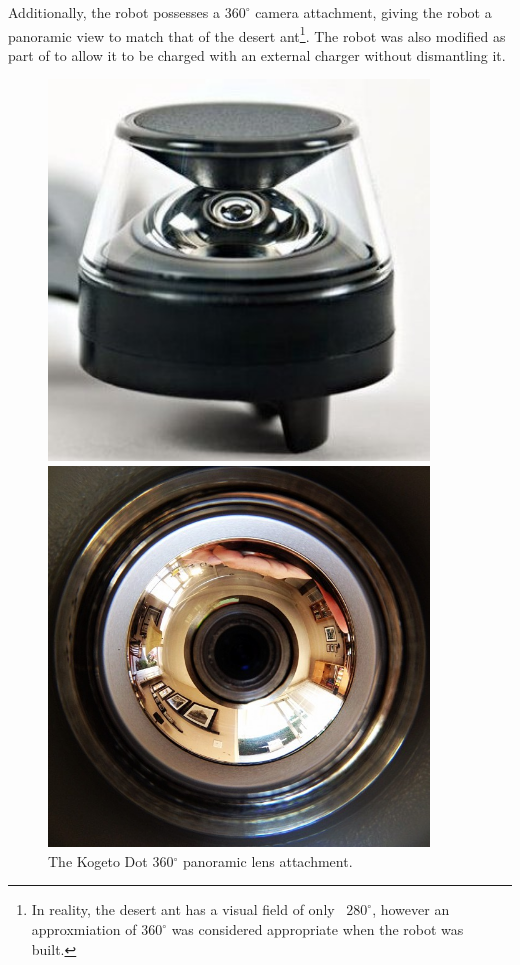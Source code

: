 \documentclass[a4paper,11pt,twoside,openright]{article}
\begin{document}
Additionally, the robot possesses a $360^{\circ}$ camera attachment, giving the
robot a panoramic view to match that of the desert ant\footnote{In reality,
  the desert ant has a visual field of only ~$280^{\circ}$\cite{Ardin2016},
  however an approxmiation of $360^{\circ}$ was considered appropriate when
  the robot was built.}. The robot was also modified as part of
\cite{Mitchell2018} to allow it to be charged with an external charger without
dismantling it.

\begin{figure}[t!]
  \centering
  \begin{minipage}[t!]{0.45\textwidth}
    \centering
    \includegraphics[width=0.9\textwidth]{KogetoDot}
    \caption{The Kogeto Dot 360$^\circ$ panoramic lens attachment.}
  \end{minipage}
  \hfill
  \begin{minipage}[t!]{0.45\textwidth}
    \centering
    \includegraphics[width=0.9\textwidth]{PanoramicView}

\end{minipage}
\end{figure}
\end{document}
